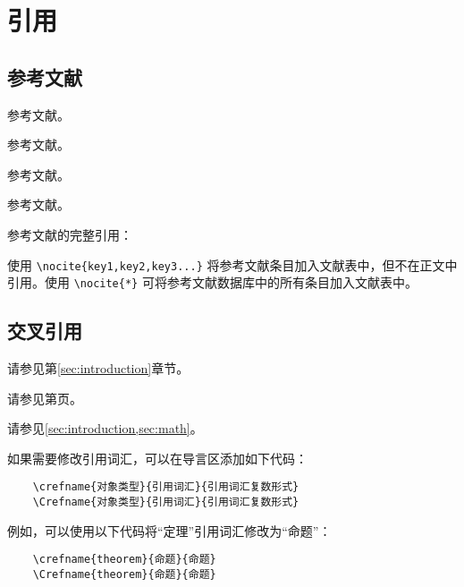 \section{引用}\label{sec:reference}

\subsection{参考文献}

参考文献。\cite{MSSB201404007}

参考文献。\cite{MSSB201404007,TJLT200705022}

参考文献。\parencite{MSSB201404007}

参考文献。

参考文献的完整引用：

使用 \verb|\nocite{key1,key2,key3...}| 将参考文献条目加入文献表中，但不在正文中引用。使用 \verb|\nocite{*}| 可将参考文献数据库中的所有条目加入文献表中。

\subsection{交叉引用}

请参见第\ref{sec:introduction}章节。

请参见第\pageref{sec:introduction}页。

请参见\cref{sec:introduction,sec:math}。

如果需要修改引用词汇，可以在导言区添加如下代码：

\begin{Verbatim}
    \crefname{对象类型}{引用词汇}{引用词汇复数形式}
    \Crefname{对象类型}{引用词汇}{引用词汇复数形式}
\end{Verbatim}

例如，可以使用以下代码将“定理”引用词汇修改为“命题”：

\begin{Verbatim}
    \crefname{theorem}{命题}{命题}
    \Crefname{theorem}{命题}{命题}
\end{Verbatim}